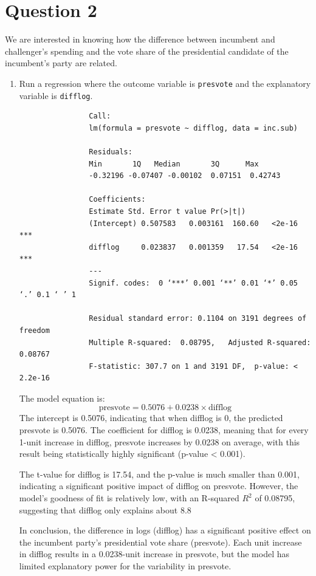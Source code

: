 \documentclass[12pt,letterpaper]{article}
\begin{document}
\newpage

\section*{Question 2}
\noindent We are interested in knowing how the difference between incumbent and challenger's spending and the vote share of the presidential candidate of the incumbent's party are related.	\vspace{.25cm}
	\begin{enumerate}
		\item Run a regression where the outcome variable is \texttt{presvote} and the explanatory variable is \texttt{difflog}.
			  
				\begin{verbatim}
				Call:
				lm(formula = presvote ~ difflog, data = inc.sub)
				
				Residuals:
				Min       1Q   Median       3Q      Max 
				-0.32196 -0.07407 -0.00102  0.07151  0.42743 
				
				Coefficients:
				Estimate Std. Error t value Pr(>|t|)    
				(Intercept) 0.507583   0.003161  160.60   <2e-16 ***
				difflog     0.023837   0.001359   17.54   <2e-16 ***
				---
				Signif. codes:  0 ‘***’ 0.001 ‘**’ 0.01 ‘*’ 0.05 ‘.’ 0.1 ‘ ’ 1
				
				Residual standard error: 0.1104 on 3191 degrees of freedom
				Multiple R-squared:  0.08795,	Adjusted R-squared:  0.08767 
				F-statistic: 307.7 on 1 and 3191 DF,  p-value: < 2.2e-16
			\end{verbatim}  
			  
			 The model equation is:
			\[
			\text{presvote} = 0.5076 + 0.0238 \times \text{difflog}
			\]
			The intercept is 0.5076, indicating that when  difflog is 0, the predicted presvote  is 0.5076. The coefficient for difflog is 0.0238, meaning that for every 1-unit increase in difflog, presvote increases by 0.0238 on average, with this result being statistically highly significant (p-value < 0.001).
			
			The t-value for difflog is 17.54, and the p-value is much smaller than 0.001, indicating a significant positive impact of difflog on presvote. However, the model's goodness of fit is relatively low, with an R-squared \( R^2 \) of 0.08795, suggesting that difflog only explains about 8.8%
			
			In conclusion, the difference in logs (difflog) has a significant positive effect on the incumbent party’s presidential vote share (presvote). Each unit increase in difflog results in a 0.0238-unit increase in presvote, but the model has limited explanatory power for the variability in presvote.\\
			

\end{enumerate}
\end{document}
